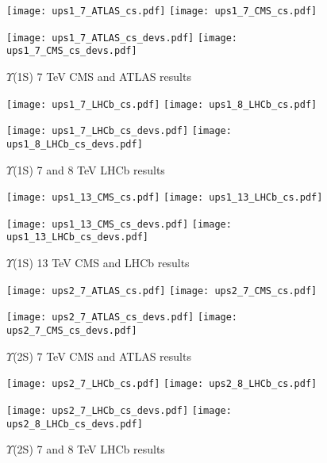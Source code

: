\documentclass{article}
\begin{document}
\clearpage

\begin{figure}
\centering
\texttt{[image: ups1\_7\_ATLAS\_cs.pdf]}
\texttt{[image: ups1\_7\_CMS\_cs.pdf]}

\texttt{[image: ups1\_7\_ATLAS\_cs\_devs.pdf]}
\texttt{[image: ups1\_7\_CMS\_cs\_devs.pdf]}
\caption{$\Upsilon$(1S) 7 TeV CMS and ATLAS results}
\end{figure}

\clearpage

\begin{figure}
\centering
\texttt{[image: ups1\_7\_LHCb\_cs.pdf]}
\texttt{[image: ups1\_8\_LHCb\_cs.pdf]}

\texttt{[image: ups1\_7\_LHCb\_cs\_devs.pdf]}
\texttt{[image: ups1\_8\_LHCb\_cs\_devs.pdf]}
\caption{$\Upsilon$(1S) 7 and 8 TeV LHCb results}
\end{figure}

\clearpage

\begin{figure}
\centering
\texttt{[image: ups1\_13\_CMS\_cs.pdf]}
\texttt{[image: ups1\_13\_LHCb\_cs.pdf]}

\texttt{[image: ups1\_13\_CMS\_cs\_devs.pdf]}
\texttt{[image: ups1\_13\_LHCb\_cs\_devs.pdf]}
\caption{$\Upsilon$(1S) 13 TeV CMS and LHCb results}
\end{figure}

\clearpage


\begin{figure}
\centering
\texttt{[image: ups2\_7\_ATLAS\_cs.pdf]}
\texttt{[image: ups2\_7\_CMS\_cs.pdf]}

\texttt{[image: ups2\_7\_ATLAS\_cs\_devs.pdf]}
\texttt{[image: ups2\_7\_CMS\_cs\_devs.pdf]}
\caption{$\Upsilon$(2S) 7 TeV CMS and ATLAS results}
\end{figure}

\clearpage

\begin{figure}
\centering
\texttt{[image: ups2\_7\_LHCb\_cs.pdf]}
\texttt{[image: ups2\_8\_LHCb\_cs.pdf]}

\texttt{[image: ups2\_7\_LHCb\_cs\_devs.pdf]}
\texttt{[image: ups2\_8\_LHCb\_cs\_devs.pdf]}
\caption{$\Upsilon$(2S) 7 and 8 TeV LHCb results}
\end{figure}
\end{document}
